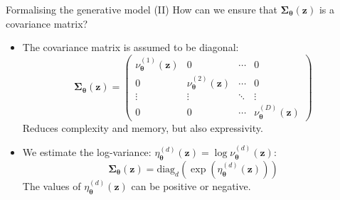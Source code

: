 \documentclass[aspectratio=169]{beamer}
\newcommand{\bs}[1]{\boldsymbol{#1}}
\begin{document}
\begin{frame}{Formalising the generative model (II)}
  How can we ensure that $\bs{\Sigma}_{\bs{\theta}}(\bs{z})$ is a covariance matrix?
  \begin{itemize}
   \item The covariance matrix is assumed to be diagonal:
   \begin{equation}\bs{\Sigma}_{\bs{\theta}}(\bs{z}) = \left(\begin{array}{cccc}
   \nu^{(1)}_{\bs{\theta}}(\bs{z}) & 0 & \cdots & 0 \\
   0 & \nu^{(2)}_{\bs{\theta}}(\bs{z}) & \cdots & 0 \\
   \vdots & \vdots & \ddots & \vdots \\
   0 & 0 & \cdots & \nu^{(D)}_{\bs{\theta}}(\bs{z})
   \end{array}\right)\end{equation}
   Reduces complexity and memory, but also expressivity.
   \item We estimate the log-variance: $\eta^{(d)}_{\bs{\theta}}(\bs{z}) = \log \nu^{(d)}_{\bs{\theta}}(\bs{z})$:
   \begin{equation}\bs{\Sigma}_{\bs{\theta}}(\bs{z}) = \textrm{diag}_d \left(\exp \left(\eta^{(d)}_{\bs{\theta}}(\bs{z})\right)\right)\end{equation}
   The values of $\eta^{(d)}_{\bs{\theta}}(\bs{z})$ can be positive or negative.
  \end{itemize}


\end{frame}
\end{document}

